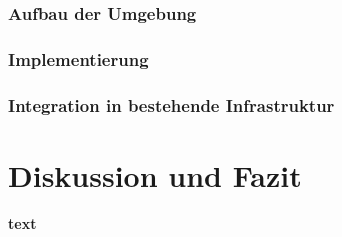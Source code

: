 \documentclass[a4paper, 12pt, oneside]{scrbook}
\begin{document}
		\subsection{Aufbau der Umgebung}
		
		\subsection{Implementierung}
		
			
		
		\subsection{Integration in bestehende Infrastruktur}
			

	
	
	\chapter{Diskussion und Fazit}\label{ch:Diskussion_Fazit}
	
	
	
	
	\frontmatter
	\printbibliography
	
	\textbf{text}
\end{document}
